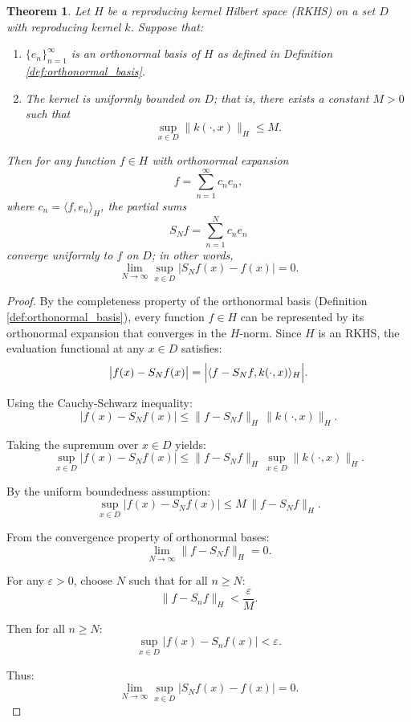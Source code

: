 \documentclass{article}
\newtheorem{theorem}{Theorem}
\theoremstyle{definition}
\begin{document}
\begin{theorem}
\label{thm:uniform_convergence}
Let $H$ be a reproducing kernel Hilbert space (RKHS) on a set $D$ with reproducing kernel $k$. Suppose that:
\begin{enumerate}
    \item $\{e_n\}_{n=1}^{\infty}$ is an orthonormal basis of $H$ as defined in Definition \ref{def:orthonormal_basis}.
    \item The kernel is uniformly bounded on $D$; that is, there exists a constant $M > 0$ such that
    \[
    \sup_{x \in D} \|k(\cdot, x)\|_H \le M.
    \]
\end{enumerate}
Then for any function $f \in H$ with orthonormal expansion
\[
f = \sum_{n=1}^{\infty} c_n e_n,
\]
where $c_n = \langle f, e_n \rangle_H$, the partial sums
\[
S_N f = \sum_{n=1}^N c_n e_n
\]
converge uniformly to $f$ on $D$; in other words,
\[
\lim_{N\to\infty} \sup_{x\in D} \bigl| S_N f(x) - f(x) \bigr| = 0.
\]
\end{theorem}

\begin{proof}
By the completeness property of the orthonormal basis (Definition \ref{def:orthonormal_basis}), every function $f \in H$ can be represented by its orthonormal expansion that converges in the $H$-norm. Since $H$ is an RKHS, the evaluation functional at any $x \in D$ satisfies:
\[
\bigl| f(x) - S_N f(x) \bigr| = \Bigl| \langle f - S_N f, k(\cdot, x) \rangle_H \Bigr|.
\]

Using the Cauchy-Schwarz inequality:
\[
\bigl| f(x) - S_N f(x) \bigr| \le \|f - S_N f\|_H \, \|k(\cdot, x)\|_H.
\]

Taking the supremum over $x \in D$ yields:
\[
\sup_{x \in D} \bigl| f(x) - S_N f(x) \bigr| \le \|f - S_N f\|_H \, \sup_{x \in D} \|k(\cdot, x)\|_H.
\]

By the uniform boundedness assumption:
\[
\sup_{x \in D} \bigl| f(x) - S_N f(x) \bigr| \le M \, \|f - S_N f\|_H.
\]

From the convergence property of orthonormal bases:
\[
\lim_{N\to\infty} \|f - S_N f\|_H = 0.
\]

For any $\varepsilon > 0$, choose $N$ such that for all $n \ge N$:
\[
\|f - S_n f\|_H < \frac{\varepsilon}{M}.
\]

Then for all $n \ge N$:
\[
\sup_{x \in D} \bigl| f(x) - S_n f(x) \bigr| < \varepsilon.
\]

Thus:
\[
\lim_{N\to\infty} \sup_{x\in D} |S_N f(x) - f(x)| = 0.
\]
\end{proof}
\end{document}
